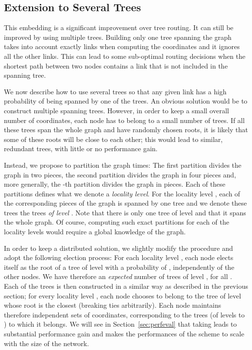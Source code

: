 \documentclass[conference]{IEEEtran}
\begin{document}
\subsection{Extension to Several Trees}
\label{sec:multipleTrees}
This embedding is a significant improvement over tree routing. It can still be improved by using multiple trees. Building only one tree spanning the graph takes into account exactly  links when computing the coordinates and it ignores all the other links.  This can lead to some sub-optimal routing decisions when the shortest path between two nodes contains a link that is not included in the spanning tree.

We now describe how to use several trees so that any given link has a high probability of being spanned by one of the trees. 
An obvious solution would be to construct multiple spanning trees. However, in order to keep a small overall number of coordinates, each node has to belong to a small number of trees. If all these trees span the whole graph and have randomly chosen roots, it is likely that some of these roots will be close to each other; this would lead to similar, redundant trees, with little or no performance gain.

Instead, we propose to partition the graph  times: 
The first partition divides the graph in two pieces, the second partition divides the graph in four pieces and, more generally, the -th partition divides the graph in  pieces. Each of these  partitions defines what we denote a \emph{locality level}.
For the locality level , each of the corresponding  pieces of the graph is spanned by one tree and we denote these  trees the trees \emph{of level} .
Note that there is only one tree of level  and that it spans the whole graph.
Of course, computing such exact partitions for each of the  locality levels would require a global knowledge of the graph.


In order to keep a distributed solution, we slightly modify the procedure and adopt the following election process: For each locality level , each node elects itself as the root of a tree of level  with a probability of , independently of the other nodes. We have therefore an \emph{expected} number of  trees of level , for all . Each of the trees is then constructed in a similar way as described in the previous section; for every locality level , each node chooses to belong to the tree of level  whose root is the closest (breaking ties arbitrarily). Each node maintains therefore  independent sets of coordinates, corresponding to the  trees (of levels  to ) to which it belongs. We will see in Section~\ref{sec:perfeval} that taking  leads to substantial performance gain and makes the performances of the scheme to scale with the size of the network.
\end{document}

